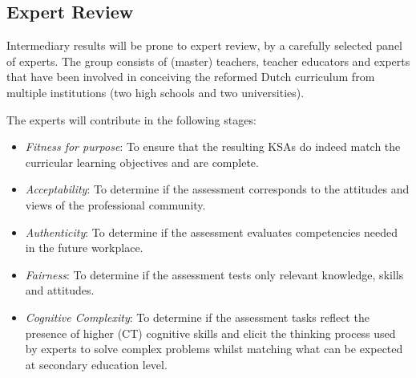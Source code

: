 \subsection{Expert Review}
Intermediary results will be prone to expert review, by a carefully selected panel of experts. The group consists of (master) teachers, teacher educators and experts that have been involved in conceiving the reformed Dutch curriculum from multiple institutions (two high schools and two universities).

The experts will contribute in the following stages:
\begin{itemize}
\item \emph{Fitness for purpose}: To ensure that the resulting KSAs do indeed match the curricular learning objectives and are complete.
\item \emph{Acceptability}: To determine if the assessment corresponds to the attitudes and views of the professional community.
\item \emph{Authenticity}: To determine if the assessment evaluates competencies needed in the future workplace.

\item \emph{Fairness}: To determine if the assessment tests only relevant knowledge, skills and attitudes.
\item \emph{Cognitive Complexity}: To determine if the assessment tasks reflect the presence of higher (CT) cognitive skills and elicit the thinking process used by experts to solve complex problems whilst matching what can be expected at secondary education level.
\end{itemize}





%


